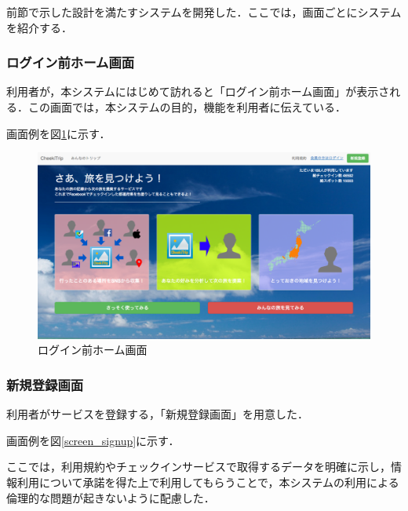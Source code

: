 \documentclass{jsarticle}
\begin{document}
前節で示した設計を満たすシステムを開発した．ここでは，画面ごとにシステムを紹介する．

\subsubsection{ログイン前ホーム画面}

利用者が，本システムにはじめて訪れると「ログイン前ホーム画面」が表示される．この画面では，本システムの目的，機能を利用者に伝えている．

画面例を図\ref{screen_home_before_login}に示す．

\begin{figure}[h!]
\begin{center}
\includegraphics[width=12.0cm]{./image/cheektrip_top_before_login.png}
\caption{ログイン前ホーム画面}
\label{screen_home_before_login}
\end{center}
\end{figure}

\subsubsection{新規登録画面}

利用者がサービスを登録する，「新規登録画面」を用意した．

画面例を図\ref{screen_signup}に示す．

ここでは，利用規約やチェックインサービスで取得するデータを明確に示し，情報利用について承諾を得た上で利用してもらうことで，本システムの利用による倫理的な問題が起きないように配慮した．
\end{document}
